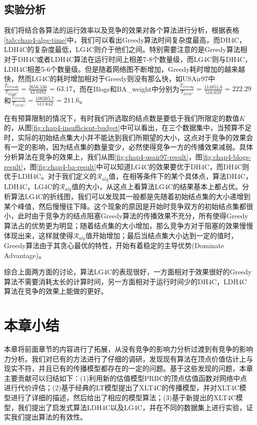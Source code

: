 \subsection{实验分析}
我们将结合各算法的运行效率以及竞争的效果对各个算法进行分析，根据表格\ref{tab:chap4-algs-time}中，我们可以看出Greedy算法时间复杂度最高，而DH4C，LDH4C的复杂度最低，LG4C则介于他们之间。特别需要注意的是Greedy算法相对于DH4C或者LDH4C算法在运行时间上相差7-8个数量级，而LG4C则与DH4C，LDH4C相差5-6个数量级。但是随着网络图不断增加，Greedy耗时增加的越来越快，然而LG4C的耗时增加相对于Greedy则没有那么快，如USAir97中$\frac{T_{Greedy}}{T_{LG4C}}=\frac{2656.336}{42.0492}=63.17$，而在Blogs和BA\_weight中分别为$\frac{T_{Greedy}}{T_{LG4C}}=\frac{114851.6}{516.659}=222.29$和$\frac{T_{Greedy}}{T_{LG4C}}=\frac{108265.7}{511.642}=211.6$。


在有预算限制的情况下，有时我们所选取的结点数是要低于我们所限定的数值$K$的，从图\ref{fig:chap4-insufficient-budget}中可以看出，在三个数据集中，当预算不足时，实际的初始结点集大小并不能达到我们所期望的大小，这点对于竞争的效果会有一定的影响，因为结点集的数量变少，必然使得竞争一方的传播效果减弱。具体分析算法在竞争的效果上，我们从图\ref{fig:chap4-usair97-result}，图\ref{fig:chap4-blogs-result}，图\ref{fig:chap4-ba-result}中可以知道LG4C的效果要优于DH4C，而DH4C则优于LDH4C。对于我们定义的$\mathcal{R}_{alg}$值，在相等条件下的某个具体点，算法DH4C，LDH4C，LG4C的$\mathcal{R}_{alg}$值的大小，从这点上看算法LG4C的结果基本上都占优。分析算法LG4C的折线图，我们可以发现其一般都是先随着初始结点集的大小递增到某个峰值，然后慢慢往下降。这个现象的原因是开始时竞争双方的初始结点集都很小，此时由于竞争方的结点阻塞Greedy算法的传播效果不充分，所有使得Greedy算法占的优势更为明显；随着结点集的大小增加，那么竞争方对于阻塞的效果慢慢体现出来，这样就使得$\mathcal{R}_{alg}$值开始增加；最后当结点集大小达到一定的值时，Greedy算法由于其贪心最优的特性，开始有着稳定的主导优势(Dominate Advantage)。

综合上面两方面的讨论，算法LG4C的表现很好，一方面相对于效果很好的Greedy算法不需要消耗太长的计算时间，另一方面相对于运行时间少的DH4C，LDH4C算法在竞争的效果上能做的更好。


\section{本章小结}
本章将前面章节的内容进行了拓展，从没有竞争的影响力分析过渡到有竞争的影响力分析。我们对已有的方法进行了仔细的调研，发现现有算法在顶点价值估计上与现实不符，并且已有的传播模型都存在的一定的问题。基于这些发现的问题，本章主要贡献可以归结如下：(1)利用新的估值模型PRBC的顶点估值函数对网络中点进行代价评估；(2)基于经典的LT模型提出了XLT4C的传播模型，并对XLT4C模型进行了详细的描述，然后给出了相应的模型算法；(3)基于新提出的XLT4C模型，我们提出了启发式算法LDH4C以及LG4C，并在不同的数据集上进行实验，证实我们提出算法的有效性。